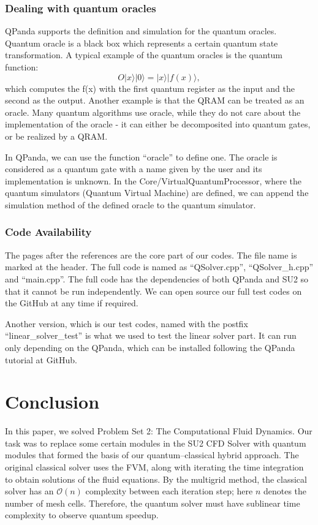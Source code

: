 \documentclass[%
 reprint,
 amsmath,amssymb,
pra,
]{revtex4-1}
\begin{document}
\subsubsection{Dealing with quantum oracles}
QPanda supports the definition and simulation for the quantum oracles. Quantum oracle is a black box which represents a certain quantum state transformation. A typical example of the quantum oracles is the quantum function:
\begin{equation}
	O|x\rangle|0\rangle = |x\rangle|f(x)\rangle,
\end{equation} 
which computes the f(x) with the first quantum register as the input and the second as the output. Another example is that the  QRAM can be treated as an oracle. Many quantum algorithms use oracle, while they do not care about the implementation of the oracle - it can either be decomposited into quantum gates, or be realized by a QRAM.

In QPanda, we can use the function ``oracle'' to define one. The oracle is considered as a quantum gate with a name given by the user and its implementation is unknown. In the Core/VirtualQuantumProcessor, where the quantum simulators (Quantum Virtual Machine) are defined, we can append the simulation method of the defined oracle to the quantum simulator.

\subsubsection{Code Availability}
The pages after the references are the core part of our codes. The file name is marked at the header. The full code is named as ``QSolver.cpp'', ``QSolver\_h.cpp'' and ``main.cpp''. The full code has the dependencies of both QPanda and SU2 so that it cannot be run independently. We can open source our full test codes on the GitHub at any time if required.

Another version, which is our test codes, named with the postfix ``linear\_solver\_test'' is what we used to test the linear solver part. It can run only depending on the QPanda, which can be installed following the QPanda tutorial at GitHub.

\section{Conclusion}

In this paper, we solved Problem Set 2: The Computational Fluid Dynamics. Our task was to replace some certain modules in the SU2 CFD Solver with quantum modules that formed the basis of our quantum--classical hybrid approach. The original classical solver uses the FVM, along with iterating the time integration to obtain solutions of the fluid equations. By the multigrid method, the classical solver has an $\mathcal{O}(n)$ complexity between each iteration step; here $n$ denotes the number of mesh cells. Therefore, the quantum solver must have sublinear time complexity to observe quantum speedup.
\end{document}
